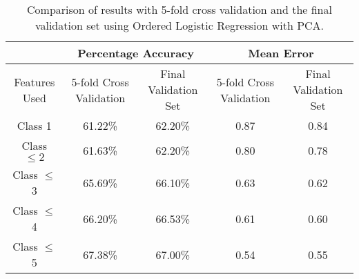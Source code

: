 \begin{table}[p]
\centering
\begin{tabular}{|c|c|c|c|c|}
\hline
& \multicolumn{2}{|c|}{Percentage Accuracy} & \multicolumn{2}{|c|}{Mean Error} \\ \hline
Features Used & 5-fold Cross Validation & Final Validation Set & 5-fold Cross Validation & Final Validation Set \\ \hline
Class 1        & 61.22\% & 62.20\% & 0.87 & 0.84 \\ \hline
Class $\leq 2$ & 61.63\% & 62.20\% & 0.80 & 0.78 \\ \hline
Class $\leq$ 3 & 65.69\% & 66.10\% & 0.63 & 0.62 \\ \hline
Class $\leq$ 4 & 66.20\% & 66.53\% & 0.61 & 0.60 \\ \hline
Class $\leq$ 5 & 67.38\% & 67.00\% & 0.54 & 0.55 \\ \hline
\end{tabular}
\caption{Comparison of results with 5-fold cross validation and the final validation set using Ordered Logistic Regression with PCA.}
\label{finaleval_table2}
\end{table}